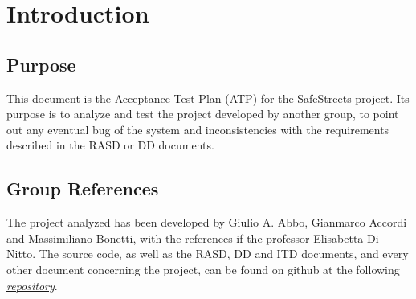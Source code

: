 \documentclass[../ATD.tex]{subfiles}
\begin{document}
    \chapter{Introduction}\label{ch:introduction}
    \section{Purpose}\label{sec:purpose}
    This document is the Acceptance Test Plan (ATP) for the SafeStreets project.
    Its purpose is to analyze and test the project developed by another group, to point out any eventual bug of the system and inconsistencies with the requirements described in the RASD or DD documents.
    \section{Group References}\label{sec:group-references}
    The project analyzed has been developed by Giulio A. Abbo, Gianmarco Accordi and Massimiliano Bonetti, with the references if the professor Elisabetta Di Nitto.
    The source code, as well as the RASD, DD and ITD documents, and every other document concerning the project, can be found on github at the following \href{https://github.com/gianfi12/AbboAccordiBonetti}{\emph{repository}}.
\end{document}
